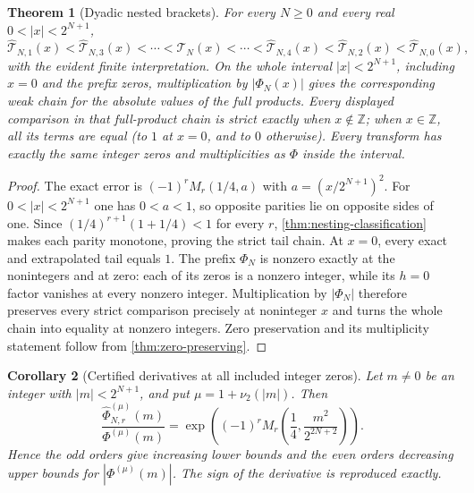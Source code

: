 \documentclass[11pt,oneside]{article}
\numberwithin{equation}{section}
\theoremstyle{frontier}
\newtheorem{theorem}{Theorem}[section]
\newtheorem{corollary}[theorem]{Corollary}
\theoremstyle{definition}
\theoremstyle{remark}
\newcommand{\Z}{\mathbb Z}
\newcommand{\vtwo}{\nu_2}
\begin{document}
\begin{theorem}[Dyadic nested brackets]\label{thm:dyadic-chains}
For every $N\ge0$ and every real $0<|x|<2^{N+1}$,
\begin{equation}
 \widehat{\mathcal T}_{N,1}(x)
 <\widehat{\mathcal T}_{N,3}(x)<\cdots
 <\mathcal T_N(x)
 <\cdots<\widehat{\mathcal T}_{N,4}(x)
 <\widehat{\mathcal T}_{N,2}(x)
 <\widehat{\mathcal T}_{N,0}(x),
 \label{eq:tail-chains}
\end{equation}
with the evident finite interpretation.  On the whole interval $|x|<2^{N+1}$, including
$x=0$ and the prefix zeros, multiplication by $|\Phi_N(x)|$ gives the corresponding weak
chain for the absolute values of the full products.  Every displayed comparison in that
full-product chain is strict exactly when $x\notin\Z$; when $x\in\Z$, all its terms are equal
(to $1$ at $x=0$, and to $0$ otherwise).  Every transform has exactly the same integer zeros
and multiplicities as $\Phi$ inside the interval.
\end{theorem}

\begin{proof}
The exact error is $(-1)^rM_r(1/4,a)$ with
$a=(x/2^{N+1})^2$.  For $0<|x|<2^{N+1}$ one has $0<a<1$, so opposite parities lie on
opposite sides of one.  Since
$(1/4)^{r+1}(1+1/4)<1$ for every $r$, \cref{thm:nesting-classification} makes each parity
monotone, proving the strict tail chain.  At $x=0$, every exact and extrapolated tail equals
$1$.  The prefix $\Phi_N$ is nonzero exactly at the nonintegers and at zero: each of its
zeros is a nonzero integer, while its $h=0$ factor vanishes at every nonzero integer.
Multiplication by $|\Phi_N|$ therefore preserves every strict comparison precisely at
noninteger $x$ and turns the whole chain into equality at nonzero integers.  Zero
preservation and its multiplicity statement follow from \cref{thm:zero-preserving}.
\end{proof}

\begin{corollary}[Certified derivatives at all included integer zeros]\label{cor:integer-jets}
Let $m\ne0$ be an integer with $|m|<2^{N+1}$, and put
$\mu=1+\vtwo(|m|)$.  Then
\begin{equation}
 \frac{\widehat\Phi_{N,r}^{(\mu)}(m)}{\Phi^{(\mu)}(m)}
 =\exp\!\left((-1)^rM_r\!\left(\frac14,\frac{m^2}{2^{2N+2}}\right)\right).
 \label{eq:dyadic-derivative-ratio}
\end{equation}
Hence the odd orders give increasing lower bounds and the even orders decreasing upper
bounds for $|\Phi^{(\mu)}(m)|$.  The sign of the derivative is reproduced exactly.
\end{corollary}
\end{document}

